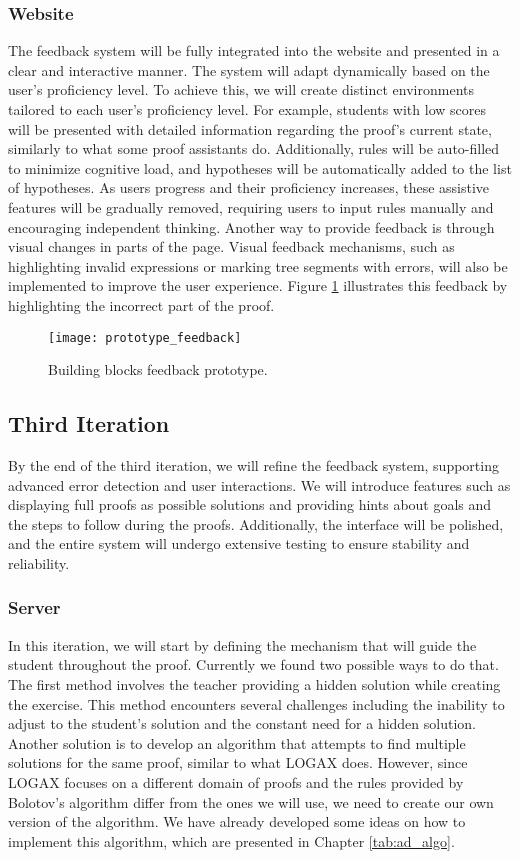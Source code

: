 \subsubsection{Website}
The feedback system will be fully integrated into the website and presented in a clear and interactive manner. The system will adapt dynamically based on the user's proficiency level. To achieve this, we will create distinct environments tailored to each user's proficiency level. For example, students with low scores will be presented with detailed information regarding the proof's current state, similarly to what some proof assistants do. Additionally, rules will be auto-filled to minimize cognitive load, and hypotheses will be automatically added to the list of hypotheses. As users progress and their proficiency increases, these assistive features will be gradually removed, requiring users to input rules manually and encouraging independent thinking. 
Another way to provide feedback is through visual changes in parts of the page. Visual feedback mechanisms, such as highlighting invalid expressions or marking tree segments with errors, will also be implemented to improve the user experience. Figure \ref{img:building-blocks-feedback} illustrates this feedback by highlighting the incorrect part of the proof.

\begin{figure}[htbp]
    \centering
    \texttt{[image: prototype\_feedback]}
    \caption{Building blocks feedback prototype.}
    \label{img:building-blocks-feedback}
\end{figure}

\subsection{Third Iteration}
By the end of the third iteration, we will refine the feedback system, supporting advanced error detection and user interactions. We will introduce features such as displaying full proofs as possible solutions and providing hints about goals and the steps to follow during the proofs. Additionally, the interface will be polished, and the entire system will undergo extensive testing to ensure stability and reliability.

\subsubsection{Server}
In this iteration, we will start by defining the mechanism that will guide the student throughout the proof. Currently we found two possible ways to do that. The first method involves the teacher providing a hidden solution while creating the exercise. This method encounters several challenges including the inability to adjust to the student's solution and the constant need for a hidden solution. Another solution is to develop an algorithm that attempts to find multiple solutions for the same proof, similar to what LOGAX does. However, since LOGAX focuses on a different domain of proofs and the rules provided by Bolotov's algorithm differ from the ones we will use, we need to create our own version of the algorithm. We have already developed some ideas on how to implement this algorithm, which are presented in Chapter \ref{tab:ad_algo}.

